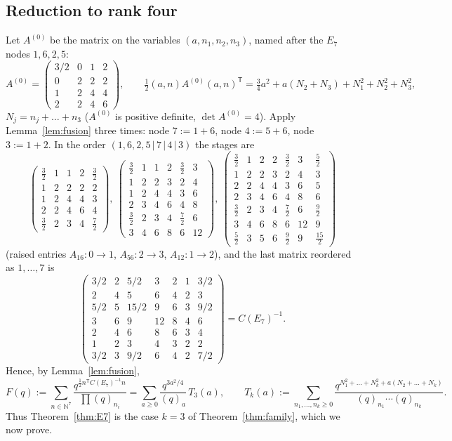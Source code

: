 \documentclass[11pt]{amsart}
\theoremstyle{definition}
\numberwithin{equation}{section}
\newcommand{\N}{\mathbb{N}}
\newcommand{\T}{\mathsf T}
\begin{document}
\subsection{Reduction to rank four}
Let $A^{(0)}$ be the matrix on the variables $(a,n_1,n_2,n_3)$, named after the $E_7$ nodes $1,6,2,5$:
\[
A^{(0)}=\begin{pmatrix}3/2&0&1&2\\0&2&2&2\\1&2&4&4\\2&2&4&6\end{pmatrix},\qquad
\tfrac12(a,n)A^{(0)}(a,n)^{\T}=\tfrac34a^2+a(N_2+N_3)+N_1^2+N_2^2+N_3^2,
\]
$N_j=n_j+\dots+n_3$ ($A^{(0)}$ is positive definite, $\det A^{(0)}=4$). Apply Lemma~\ref{lem:fusion} three
times: node $7:=1+6$, node $4:=5+6$, node $3:=1+2$. In the order $(1,6,2,5\,|\,7\,|\,4\,|\,3)$ the stages are
\[
\begin{pmatrix}\frac32&1&1&2&\frac32\\1&2&2&2&2\\1&2&4&4&3\\2&2&4&6&4\\\frac32&2&3&4&\frac72\end{pmatrix}\!,\
\begin{pmatrix}\frac32&1&1&2&\frac32&3\\1&2&2&3&2&4\\1&2&4&4&3&6\\2&3&4&6&4&8\\\frac32&2&3&4&\frac72&6\\3&4&6&8&6&12\end{pmatrix}\!,\
\begin{pmatrix}\frac32&1&2&2&\frac32&3&\frac52\\1&2&2&3&2&4&3\\2&2&4&4&3&6&5\\2&3&4&6&4&8&6\\\frac32&2&3&4&\frac72&6&\frac92\\3&4&6&8&6&12&9\\\frac52&3&5&6&\frac92&9&\frac{15}2\end{pmatrix}
\]
(raised entries $A_{16}:0\to1$, $A_{56}:2\to3$, $A_{12}:1\to2$), and the last matrix reordered as
$1,\dots,7$ is
\[
\begin{pmatrix}
3/2&2&5/2&3&2&1&3/2\\2&4&5&6&4&2&3\\5/2&5&15/2&9&6&3&9/2\\3&6&9&12&8&4&6\\2&4&6&8&6&3&4\\1&2&3&4&3&2&2\\3/2&3&9/2&6&4&2&7/2
\end{pmatrix}=C(E_7)^{-1}.
\]
Hence, by Lemma~\ref{lem:fusion},
\begin{equation}\label{eq:E7red}
F(q):=\sum_{n\in\N^7}\frac{q^{\frac12n^{\T}C(E_7)^{-1}n}}{\prod(q)_{n_i}}
=\sum_{a\ge0}\frac{q^{3a^2/4}}{(q)_a}\,T_3(a),\qquad
T_k(a):=\sum_{n_1,\dots,n_k\ge0}\frac{q^{N_1^2+\dots+N_k^2+a(N_2+\dots+N_k)}}{(q)_{n_1}\cdots(q)_{n_k}} .
\end{equation}
Thus Theorem~\ref{thm:E7} is the case $k=3$ of Theorem~\ref{thm:family}, which we now prove.
\end{document}
